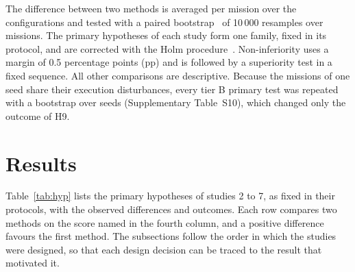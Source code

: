 \documentclass[a4paper,fleqn]{cas-dc}
\begin{document}
The difference between two methods is averaged per mission over the configurations and tested with a paired
bootstrap~\cite{efron1993bootstrap} of 10\,000 resamples over missions. The primary hypotheses of each study form one
family, fixed in its protocol, and are corrected with the Holm procedure~\cite{holm1979simple}. Non-inferiority uses a margin of 0.5 percentage points (pp) and is followed by a
superiority test in a fixed sequence. All other comparisons are descriptive. Because the missions of one seed share
their execution disturbances, every tier B primary test was repeated with a bootstrap over seeds (Supplementary
Table~S10), which changed only the outcome of H9.

\section{Results}\label{sec:results}
Table~\ref{tab:hyp} lists the primary hypotheses of studies 2 to 7, as fixed in their protocols, with the observed
differences and outcomes. Each row compares two methods on the score named in the fourth column, and a positive
difference favours the first method. The subsections follow the order in which the studies were designed, so that each
design decision can be traced to the result that motivated it.
\end{document}

